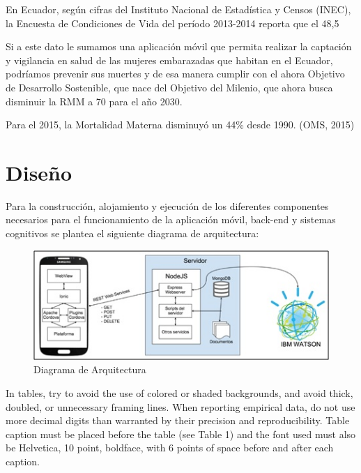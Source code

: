 \documentclass[12pt]{article}
\begin{document}
En Ecuador, según cifras del Instituto Nacional de Estadística y Censos (INEC), la Encuesta de Condiciones de Vida del período 2013-2014 reporta que el 48,5%

Si a este dato le sumamos una aplicación móvil que permita realizar la captación y vigilancia en salud de las mujeres embarazadas que habitan en el Ecuador, podríamos prevenir sus muertes y de esa manera cumplir con el ahora Objetivo de Desarrollo Sostenible, que nace del Objetivo del Milenio, que ahora busca disminuir la RMM a 70 para el año 2030.

Para el 2015, la Mortalidad Materna disminuyó un 44\% desde 1990. (OMS, 2015)

\section{Diseño}
\label{sec:firstpage}

Para la construcción, alojamiento y ejecución de los diferentes componentes necesarios para el funcionamiento de la aplicación móvil, back-end y sistemas cognitivos se plantea el siguiente diagrama de arquitectura:

\begin{figure}[ht]
\centering
\includegraphics[width=.8\textwidth]{model.jpg}
\caption{Diagrama de Arquitectura}
\label{fig:exampleFig1}
\end{figure}

%

In tables, try to avoid the use of colored or shaded backgrounds, and avoid
thick, doubled, or unnecessary framing lines. When reporting empirical data,
do not use more decimal digits than warranted by their precision and
reproducibility. Table caption must be placed before the table (see Table 1)
and the font used must also be Helvetica, 10 point, boldface, with 6 points of
space before and after each caption.
\end{document}
